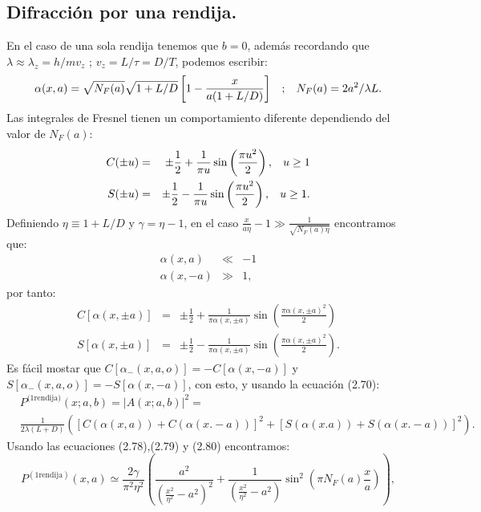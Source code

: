 \subsection{Difracción por una rendija.}
En el caso de una sola rendija tenemos que $b=0$, además recordando que $\lambda\approx\lambda_z=h/mv_z$ ; $v_z=L/\tau=D/T$, podemos escribir:
\begin{equation}
\alpha(x,a)=\sqrt{N_F(a)}\sqrt{1+L/D}\left[	1-\frac{x}{a(1+L/D)}\right] \hspace{0.3cm};\hspace{0.3cm} N_F(a)=2a^2/\lambda L .
\end{equation}
Las integrales de Fresnel tienen un comportamiento diferente dependiendo del valor de $N_F(a)$:
\begin{eqnarray}
C(\pm u)&=&\pm\frac{1}{2}+\frac{1}{\pi u}\sin\left(\frac{\pi u^2}{2}\right),\hspace{0.3cm}u\geq 1\\
S(\pm u)&=&\pm\frac{1}{2}-\frac{1}{\pi u}\sin\left(\frac{\pi u^2}{2}\right),\hspace{0.3cm}u\geq 1 .
\end{eqnarray}
Definiendo $\eta\equiv 1+L/D$ y $\gamma=\eta-1$, en el caso $\frac{x}{a\eta}-1\gg\frac{1}{\sqrt{N_F(a)\eta}}$ encontramos que:
\begin{eqnarray}
\alpha(x,a)&\ll&-1\\
\alpha(x,-a)&\gg&1 ,
\end{eqnarray} 
por tanto:
\begin{eqnarray}
C[\alpha(x,\pm a)]&=&\pm\frac{1}{2}+\frac{1}{\pi\alpha(x,\pm a) }\sin\left(\frac{\pi \alpha(x,\pm a)^2}{2}\right)\\
S[\alpha(x,\pm a)]&=&\pm\frac{1}{2}-\frac{1}{\pi\alpha(x,\pm a) }\sin\left(\frac{\pi \alpha(x,\pm a)^2}{2}\right) .
\end{eqnarray}
Es fácil mostar que $C[\alpha_-(x,a,o)]=-C[\alpha(x,-a)]$ y $S[\alpha_-(x,a,o)]=-S[\alpha(x,-a)]$, con esto, y usando la ecuación (2.70):
\begin{eqnarray}
\nonumber & P^{\text{(1rendija)}}(x;a,b)=|A(x;a,b)|^2=\\&\frac{1}{2\lambda(L+D)}
([C(\alpha(x,a))+C(\alpha(x.-a))]^{2}+[S(\alpha(x.a))+S(\alpha(x.-a))]^{2}) .
\end{eqnarray}
Usando las ecuaciones (2.78),(2.79) y (2.80) encontramos:
\begin{equation}
P^{(\text{1rendija})}(x,a)\simeq\frac{2\gamma}{\pi^{2}\eta^{2}}\left(\frac{a^{2}}{\left(\frac{x^{2}}{\eta^{2}}-a^{2}\right)^{2}}+\frac{1}{\left(\frac{x^{2}}{\eta^{2}}-a^{2}\right)}\sin^{2}\left(\pi N_{F}(a)\frac{x}{a}\right)\right) ,
\end{equation}
